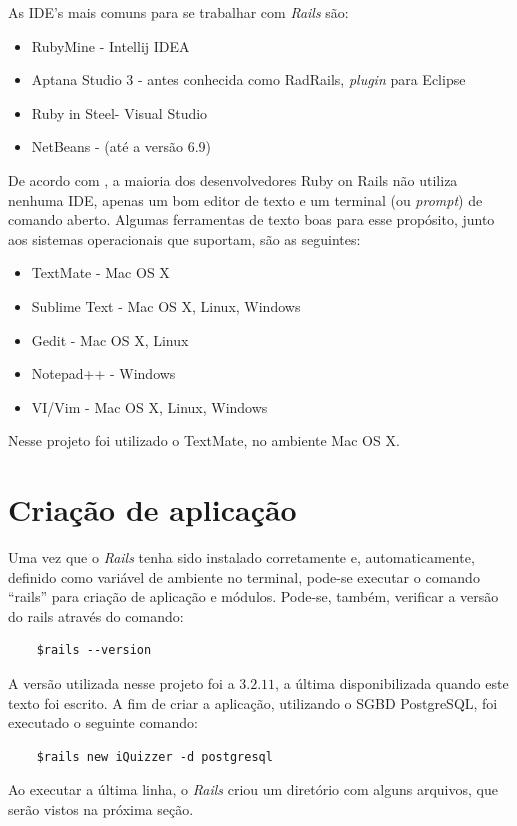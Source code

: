     As IDE's mais comuns para se trabalhar com \emph{Rails} são:
\begin{itemize}
\item RubyMine - Intellij IDEA
\item Aptana Studio 3 - antes conhecida como RadRails, \emph{plugin} para Eclipse
\item Ruby in Steel- Visual Studio
\item NetBeans - (até a versão 6.9)
\end{itemize}     
    De acordo com \cite{caelum}, a maioria dos desenvolvedores Ruby on Rails não utiliza nenhuma \ac{IDE}, apenas um bom editor de texto e um terminal (ou \emph{prompt}) de comando aberto.  Algumas ferramentas de texto boas para esse propósito, junto aos sistemas operacionais que suportam, são as seguintes:
\begin{itemize}
\item TextMate -  Mac OS X
\item Sublime Text - Mac OS X, Linux, Windows
\item Gedit - Mac OS X, Linux
\item Notepad++ - Windows
\item VI/Vim - Mac OS X, Linux, Windows
\end{itemize}
    Nesse projeto foi utilizado o TextMate, no ambiente Mac OS X.
    \section{Criação de aplicação}
            Uma vez que o \emph{Rails} tenha sido instalado corretamente e, automaticamente, definido como variável de ambiente no terminal, pode-se executar o comando ``rails'' para criação de aplicação e módulos.  Pode-se, também,  verificar a versão do rails através do comando:
			
\begin{lstlisting}
    $rails --version
\end{lstlisting}
           
    A versão utilizada nesse projeto foi a $3.2.11$, a última disponibilizada quando este texto foi escrito. A fim de criar a aplicação, utilizando o \ac{SGBD} PostgreSQL, foi executado o seguinte comando:
	\begin{lstlisting}
    $rails new iQuizzer -d postgresql
    \end{lstlisting}   
    Ao executar a última linha, o \emph{Rails} criou um diretório com alguns arquivos, que serão vistos na próxima seção.
     

